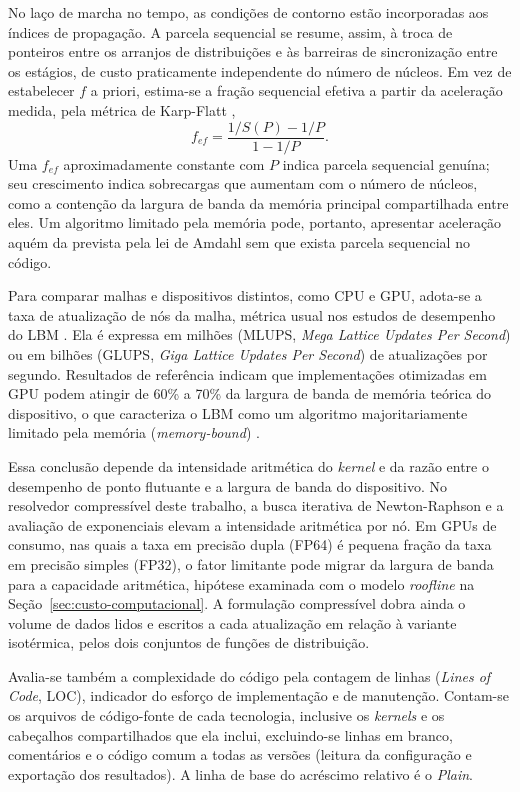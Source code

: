 No laço de marcha no tempo, as condições de contorno estão incorporadas aos índices de propagação.
A parcela sequencial se resume, assim, à troca de ponteiros entre os arranjos de distribuições e às barreiras de sincronização entre os estágios, de custo praticamente independente do número de núcleos.
Em vez de estabelecer $f$ a priori, estima-se a fração sequencial efetiva a partir da aceleração medida, pela métrica de Karp-Flatt \parencite{KarpFlatt1990},
\[
f_{ef} = \frac{1/S(P) - 1/P}{1 - 1/P}.
\]
Uma $f_{ef}$ aproximadamente constante com $P$ indica parcela sequencial genuína; seu crescimento indica sobrecargas que aumentam com o número de núcleos, como a contenção da largura de banda da memória principal compartilhada entre eles.
Um algoritmo limitado pela memória pode, portanto, apresentar aceleração aquém da prevista pela lei de Amdahl sem que exista parcela sequencial no código.

Para comparar malhas e dispositivos distintos, como CPU e GPU, adota-se a taxa de atualização de nós da malha, métrica usual nos estudos de desempenho do LBM \parencite{Wellein2006, Wittmann2013, Tomczak2021}.
Ela é expressa em milhões (MLUPS, \textit{Mega Lattice Updates Per Second}) ou em bilhões (GLUPS, \textit{Giga Lattice Updates Per Second}) de atualizações por segundo.
Resultados de referência indicam que implementações otimizadas em GPU podem atingir de 60\% a 70\% da largura de banda de memória teórica do dispositivo, o que caracteriza o LBM como um algoritmo majoritariamente limitado pela memória (\textit{memory-bound}) \parencite{Tomczak2021}.

Essa conclusão depende da intensidade aritmética do \textit{kernel} e da razão entre o desempenho de ponto flutuante e a largura de banda do dispositivo.
No resolvedor compressível deste trabalho, a busca iterativa de Newton-Raphson e a avaliação de exponenciais elevam a intensidade aritmética por nó.
Em GPUs de consumo, nas quais a taxa em precisão dupla (FP64) é pequena fração da taxa em precisão simples (FP32), o fator limitante pode migrar da largura de banda para a capacidade aritmética, hipótese examinada com o modelo \textit{roofline} na Seção~\ref{sec:custo-computacional}.
A formulação compressível dobra ainda o volume de dados lidos e escritos a cada atualização em relação à variante isotérmica, pelos dois conjuntos de funções de distribuição.

Avalia-se também a complexidade do código pela contagem de linhas (\textit{Lines of Code}, LOC), indicador do esforço de implementação e de manutenção.
Contam-se os arquivos de código-fonte de cada tecnologia, inclusive os \textit{kernels} e os cabeçalhos compartilhados que ela inclui, excluindo-se linhas em branco, comentários e o código comum a todas as versões (leitura da configuração e exportação dos resultados).
A linha de base do acréscimo relativo é o \textit{Plain}.

